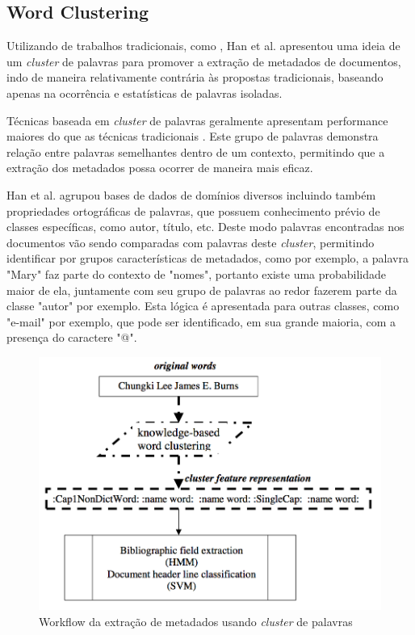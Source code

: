 \documentclass[
	12pt,               %
	openright,          %
	twoside,            %
	a4paper,            %
	english,            %
	brazil              %
	]{abntex2}
\begin{document}
\subsection{Word Clustering}

Utilizando de trabalhos tradicionais, como \cite{svm}, Han et al. \cite{rule-based} apresentou uma ideia de um \textit{cluster} de palavras para promover a extração de metadados de documentos, indo de maneira relativamente contrária às propostas tradicionais, baseando apenas na ocorrência e estatísticas de palavras isoladas.

Técnicas baseada em \textit{cluster} de palavras geralmente apresentam performance maiores do que as técnicas tradicionais \cite{rule-based}. Este grupo de palavras demonstra relação entre palavras semelhantes dentro de um contexto, permitindo que a extração dos metadados possa ocorrer de maneira mais eficaz.

Han et al. agrupou bases de dados de domínios diversos incluindo também propriedades ortográficas de palavras, que possuem conhecimento prévio de classes específicas, como autor, título, etc. Deste modo palavras encontradas nos documentos vão sendo comparadas com palavras deste \textit{cluster}, permitindo identificar por grupos características de metadados, como por exemplo, a palavra "Mary" faz parte do contexto de "nomes", portanto existe uma probabilidade maior de ela, juntamente com seu grupo de palavras ao redor fazerem parte da classe "autor" por exemplo. Esta lógica é apresentada para outras classes, como "e-mail" por exemplo, que pode ser identificado, em sua grande maioria, com a presença do caractere "@".

\begin{figure}
\centering
\caption{Workflow da extração de metadados usando \textit{cluster} de palavras}
\label{fig:workflow-rule-based}
\includegraphics[width=0.7\linewidth]{./assets/workflow-rule-based}
\end{figure}
\end{document}

